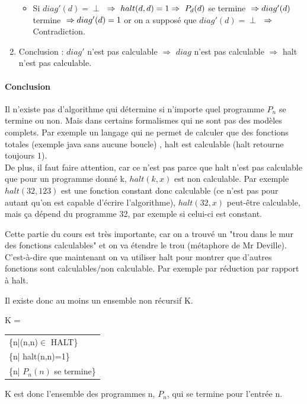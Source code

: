 \begin{enumerate}
\begin{itemize}
			\item Si $diag'(d)= \perp$ $\\
			\Rightarrow \  halt(d,d) = 1 \\
			\Rightarrow \ P_d(d)$ se termine $ \\
			\Rightarrow diag'(d)$ termine $ \\
			\Rightarrow diag'(d) = 1$ or on a supposé que $diag'(d) = \perp$ $ \\
			\Rightarrow $
			Contradiction.
		\end{itemize}
	\item Conclusion : $diag'$ n'est pas calculable $ \Rightarrow $ $diag$
	n'est pas calculable $ \Rightarrow $ halt n'est pas calculable.

\end{enumerate}

\paragraph{Conclusion} Il n'existe pas d'algorithme qui détermine si n'importe 
quel programme $P_n$ se termine ou non. Mais dans certains formalismes qui ne 
sont pas des modèles complets. Par exemple un langage qui ne permet de calculer 
que des fonctions totales (exemple java sans aucune boucle)
, halt est calculable (halt retourne toujours 1). \\

De plus, il faut faire attention, car ce n'est pas parce que halt n'est pas 
calculable que pour un programme donné k, $halt(k,x)$ est non calculable. Par 
exemple $halt(32,123)$ est une fonction constant donc calculable (ce n'est pas 
pour autant qu'on est capable d'écrire l'algorithme), $halt(32,x)$ peut-être 
calculable, mais ça dépend du 
programme 32, par exemple si celui-ci est constant.

\begin{myrem}
	Cette partie du cours est très importante, car on a trouvé un 
	"trou dans le mur des fonctions calculables" et on va étendre le trou (métaphore
	de Mr Deville). C'est-à-dire que maintenant on va utiliser halt pour montrer 
	que d'autres fonctions sont calculables/non calculable. Par exemple 
	par réduction par rapport à halt.
\end{myrem}

Il existe donc au moins un ensemble non récursif
K.

\begin{mydef}[K]
	K = 
	\begin{tabular}{l}
		\{n|(n,n)$\in$ HALT\}\\
		\{n| halt(n,n)=1\}\\
		\{n| $P_n(n)$ se termine\} \\
	\end{tabular}
	K est donc l'ensemble des programmes n, $P_n$, qui
	se termine pour l'entrée n.
\end{mydef}
	
